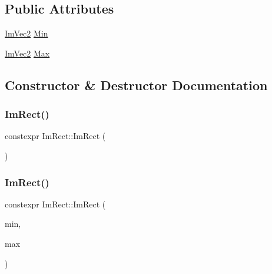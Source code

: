\subsection*{Public Attributes}
\begin{DoxyCompactItemize}
\item 
\hyperlink{structImVec2}{Im\+Vec2} \hyperlink{structImRect_af8f3fbf7ec983e03548b88e14ba68aa8}{Min}
\item 
\hyperlink{structImVec2}{Im\+Vec2} \hyperlink{structImRect_aad58c13340d320b350a72a037e3f7628}{Max}
\end{DoxyCompactItemize}


\subsection{Constructor \& Destructor Documentation}
\mbox{\label{structImRect_a1e9548c8a334dfd32eaf4d399aa740e9}} 
\subsubsection{\texorpdfstring{Im\+Rect()}{ImRect()}\hspace{0.1cm}{\footnotesize\ttfamily [1/4]}}
{\footnotesize\ttfamily constexpr Im\+Rect\+::\+Im\+Rect (\begin{DoxyParamCaption}{ }\end{DoxyParamCaption})\hspace{0.3cm}{\ttfamily [inline]}}

\mbox{\label{structImRect_af7bfb620fd01ea1f7c62c7c04e880ec4}} 
\subsubsection{\texorpdfstring{Im\+Rect()}{ImRect()}\hspace{0.1cm}{\footnotesize\ttfamily [2/4]}}
{\footnotesize\ttfamily constexpr Im\+Rect\+::\+Im\+Rect (\begin{DoxyParamCaption}\item[{const \hyperlink{structImVec2}{Im\+Vec2} \&}]{min,  }\item[{const \hyperlink{structImVec2}{Im\+Vec2} \&}]{max }\end{DoxyParamCaption})\hspace{0.3cm}{\ttfamily [inline]}}

